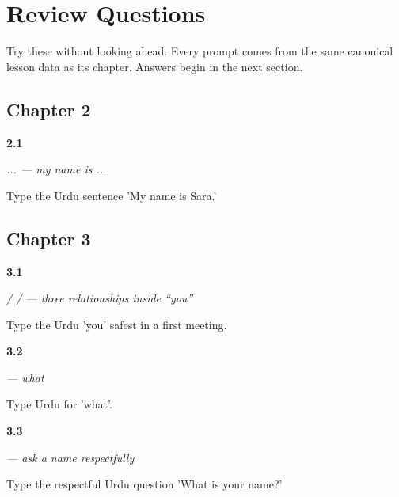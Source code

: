 
\chapter*{Review Questions}

Try these without looking ahead. Every prompt comes from the same canonical lesson data as its chapter. Answers begin in the next section.

\section*{Chapter 2}

\noindent\begin{minipage}[t]{\linewidth}
\raggedright
\hypertarget{review-UR-C02-mera-naam-sara}{\textbf{2.1}} \emph{  ...  — my name is ...}\par
\small Type the Urdu sentence 'My name is Sara.'
\end{minipage}\par\medskip

\section*{Chapter 3}

\noindent\begin{minipage}[t]{\linewidth}
\raggedright
\hypertarget{review-UR-C03-aap-tum-tu-first-meeting}{\textbf{3.1}} \emph{ /  /  — three relationships inside “you”}\par
\small Type the Urdu 'you' safest in a first meeting.
\end{minipage}\par\medskip

\noindent\begin{minipage}[t]{\linewidth}
\raggedright
\hypertarget{review-UR-C03-kya-what}{\textbf{3.2}} \emph{ — what}\par
\small Type Urdu for 'what'.
\end{minipage}\par\medskip

\noindent\begin{minipage}[t]{\linewidth}
\raggedright
\hypertarget{review-UR-C03-aap-ka-naam-kya-hai-question}{\textbf{3.3}} \emph{     — ask a name respectfully}\par
\small Type the respectful Urdu question 'What is your name?'
\end{minipage}\par\medskip

